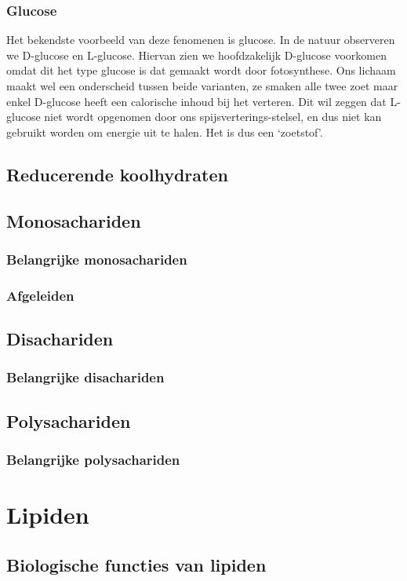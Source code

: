 \documentclass[a4paper,kul]{kulakarticle} %
\begin{document}
\subsubsection{Glucose}
Het bekendste voorbeeld van deze fenomenen is glucose. In de natuur observeren we D-glucose en L-glucose. Hiervan zien we hoofdzakelijk D-glucose voorkomen omdat dit het type glucose is dat gemaakt wordt door fotosynthese. Ons lichaam maakt wel een onderscheid tussen beide varianten, ze smaken alle twee zoet maar enkel D-glucose heeft een calorische inhoud bij het verteren. Dit wil zeggen dat L-glucose niet wordt opgenomen door ons spijsverterings-stelsel, en dus niet kan  gebruikt worden om energie uit te halen. Het is dus een `zoetstof'.

\subsection{Reducerende koolhydraten}
\subsection{Monosachariden}
\subsubsection{Belangrijke monosachariden}
\subsubsection{Afgeleiden}
\subsection{Disachariden}
\subsubsection{Belangrijke disachariden}
\subsection{Polysachariden}
\subsubsection{Belangrijke polysachariden}
\section{Lipiden}
\subsection{Biologische functies van lipiden}
\end{document}
